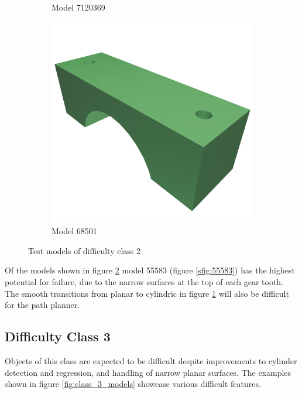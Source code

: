 \begin{figure}[htb]
\begin{subfigure}{0.3\textwidth}
	\caption{Model 7120369}
	\label{sfig:7120369}
\end{subfigure}
\hfill
\begin{subfigure}{0.3\textwidth}
	\includegraphics[width=\textwidth]{../resources/models/68501.png}
	\caption{Model 68501}
\end{subfigure}
\caption{Test models of difficulty class 2}
\label{fig:class_2_models}
\end{figure}

Of the models shown in figure \ref{fig:class_2_models} model 55583 (figure \ref{sfig:55583}) has the highest potential for failure, due to the narrow surfaces at the top of each gear tooth.
The smooth transitions from planar to cylindric in figure \ref{sfig:7120369} will also be difficult for the path planner.

\subsection{Difficulty Class 3}
Objects of this class are expected to be difficult despite improvements to cylinder detection and regression, and handling of narrow planar surfaces.
The examples shown in figure \ref{fig:class_3_models} showcase various difficult features.

